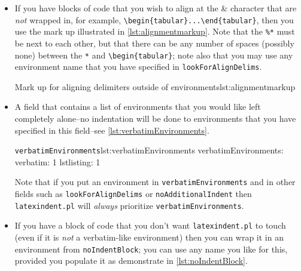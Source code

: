 \documentclass[11pt]{article}
\newcommand{\verbitem}[1]{\small\ttfamily{#1}}
\begin{document}
\begin{itemize}
	If you find that \lstinline!latexindent.pl! does not perform satisfactorily on such
	environments then you can either remove them from \lstinline!lookForAlignDelims! altogether, or set the relevant key to \lstinline!0!, for example \lstinline!tabular: 0!, or if you just want to ignore \emph{specific}
	instances of the environment, you could wrap them in something from \lstinline!noIndentBlock! (see \cref{lst:noIndentBlock}).

	\item If you have blocks of code that you wish to align at the \&  character that
		are \emph{not} wrapped in, for example, \lstinline!\begin{tabular}...\end{tabular}!, then you use the mark up
		illustrated in \cref{lst:alignmentmarkup}. Note that the \lstinline!%*! must be next to
		each other, but that there can be any number of spaces (possibly none) between the
		\lstinline!*! and \lstinline!\begin{tabular}!; note also that you may use any
		environment name that you have specified in \lstinline!lookForAlignDelims!.
		\begin{cmhlistings}[style=demo,columns=fixed]{Mark up for aligning delimiters outside of environments}{lst:alignmentmarkup}
	\end{cmhlistings}

	\item[\verbitem{verbatimEnvironments}] A field that contains a list of environments
		that you would like left completely alone--no indentation will be done
		to environments that you have specified in this field--see \cref{lst:verbatimEnvironments}.


		\begin{cmhlistings}[style=yaml]{\lstinline!verbatimEnvironments!}{lst:verbatimEnvironments}
verbatimEnvironments:
    verbatim: 1
    lstlisting: 1
	\end{cmhlistings}
	Note that if  you put an environment in \lstinline!verbatimEnvironments!
	and in other fields such as \lstinline!lookForAlignDelims! or \lstinline!noAdditionalIndent!
	then \lstinline!latexindent.pl! will \emph{always} prioritize \lstinline!verbatimEnvironments!.

	\item[\verbitem{noIndentBlock}] If you have a block of code that you don't
		want \lstinline!latexindent.pl! to touch (even if it is \emph{not} a verbatim-like
		environment) then you can wrap it in an environment from \lstinline!noIndentBlock!;
		you can use any name you like for this, provided you populate it as demonstrate in
		\cref{lst:noIndentBlock}.


\end{itemize}
\end{document}
